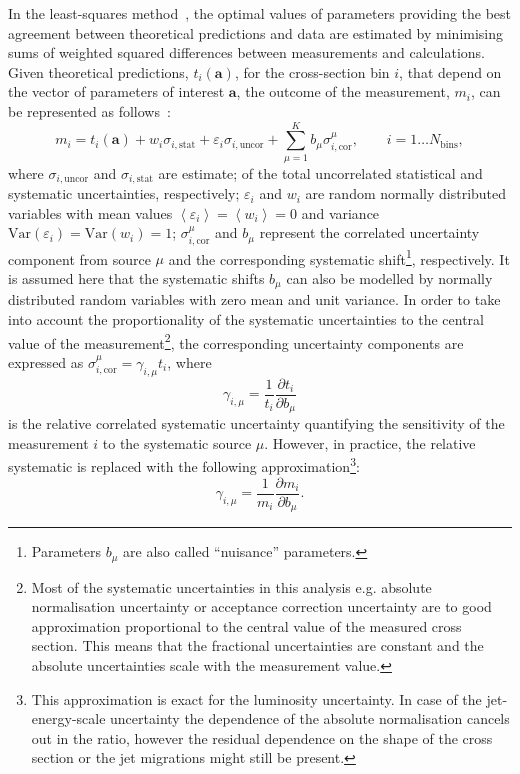 In the least-squares method~\cite{Behnke:2013pga}, the optimal values of parameters providing the best agreement between theoretical predictions and data are estimated by minimising sums of weighted squared differences between measurements and calculations. Given theoretical predictions, $t_i\left( \mathbf{a} \right)$, for the cross-section bin $i$, that depend on the vector of parameters of interest $\mathbf{a}$, the outcome of the measurement, $m_i$, can be represented as follows~\cite{Stump:2001gu,Botje:2001fx}:
\begin{equation}
 m_i = t_i\left( \mathbf{a} \right) + w_{i}\sigma_{i,\text{stat}} + \varepsilon_{i} \sigma_{i,\text{uncor}} + \sum_{\mu=1}^{K}{b_{\mu}\sigma_{i,\text{cor}}^\mu}, \qquad i=1\ldots N_\text{bins},
\label{eq:measmodel}
\end{equation}
where $\sigma_{i,\text{uncor}}$ and $\sigma_{i,\text{stat}}$ are estimate; of the total uncorrelated statistical and systematic uncertainties, respectively; $\varepsilon_{i}$ and $w_{i}$ are random normally distributed variables with mean values $\left\langle \varepsilon_{i}\right\rangle = \left\langle w_{i} \right\rangle = 0$ and variance $\text{Var}\left( \varepsilon_{i}\right) = \text{Var}\left( w_{i}\right)  = 1$; $\sigma_{i,\text{cor}}^\mu$ and $b_{\mu}$ represent the correlated uncertainty component from source $\mu$ and the corresponding systematic shift\footnote{Parameters $b_\mu$ are also called ``nuisance'' parameters.}, respectively. It is assumed here that the systematic shifts $b_{\mu}$ can also be modelled by normally distributed random variables with zero mean and unit variance. In order to take into account the proportionality of the systematic uncertainties to the central value of the measurement\footnote{Most of the systematic uncertainties in this analysis e.g. absolute normalisation uncertainty or acceptance correction uncertainty are to good approximation proportional to the central value of the measured cross section. This means that the fractional uncertainties are constant and the absolute uncertainties scale with the measurement value.}, the corresponding uncertainty components are expressed as $\sigma_{i,\text{cor}}^\mu = \gamma_{i,\mu}t_i$, where 
\begin{equation}
\gamma_{i,\mu}=\frac{1}{{t_i}} \frac{\partial t_i}{\partial b_{\mu}}
\end{equation}
is the relative correlated systematic uncertainty quantifying the sensitivity of the measurement $i$ to the systematic source $\mu$. However, in practice, the relative systematic is replaced with the following approximation\footnote{This approximation is exact for the luminosity uncertainty. In case of the jet-energy-scale uncertainty the dependence of the absolute normalisation cancels out in the ratio, however the residual dependence on the shape of the cross section or the jet migrations might still be present.}:
\begin{equation}
\gamma_{i,\mu}=\frac{1}{{m_i}} \frac{\partial m_i}{\partial b_{\mu}}.
\end{equation}

